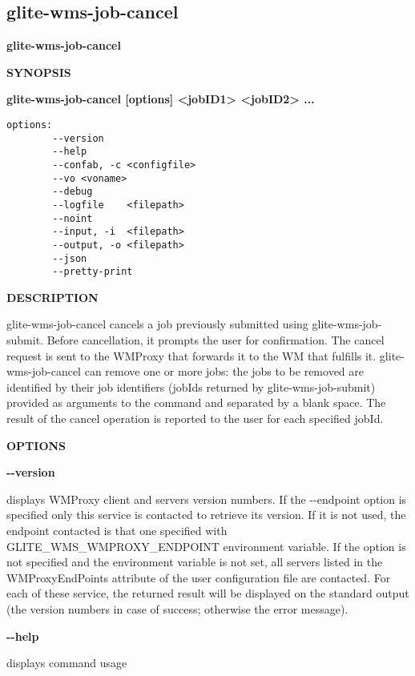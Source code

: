 
\subsection{glite-wms-job-cancel}
\label{glite-wms-job-cancel}

\medskip
\textbf{glite-wms-job-cancel}
\smallskip


\textbf{SYNOPSIS}
\smallskip

\textbf{glite-wms-job-cancel [options]  <jobID1> <jobID2> ... }

\begin{verbatim}
options:
        --version
        --help
        --confab, -c <configfile>
        --vo <voname>
        --debug
        --logfile    <filepath>
        --noint
        --input, -i  <filepath>
        --output, -o <filepath>
        --json
        --pretty-print
\end{verbatim}

\medskip
\textbf{DESCRIPTION}
\smallskip

glite-wms-job-cancel cancels a job previously submitted using glite-wms-job-submit. 
Before cancellation, it prompts the user for confirmation. 
The cancel request is sent to the WMProxy that forwards it to the WM that fulfills it. 
glite-wms-job-cancel can remove one or more jobs: the jobs to be removed are 
identified by their job identifiers (jobIds returned by glite-wms-job-submit) 
provided as arguments to the command and separated by a blank space. 
The result of the cancel operation is reported to the user for each specified jobId.


\medskip\textbf{OPTIONS}\smallskip



\textbf{-{}-version}

displays WMProxy client and servers version numbers.
If the -{}-endpoint option is specified only this service is contacted to retrieve its version. If it is not used, the endpoint contacted is that one specified with GLITE\_WMS\_WMPROXY\_ENDPOINT environment variable. If the option is not specified and the environment variable is not set, all servers listed in the WMProxyEndPoints attribute of the user configuration file are contacted. For each of these service, the returned result will be displayed on the standard output (the version numbers in case of success; otherwise the error message).




\textbf{-{}-help}

displays command usage




